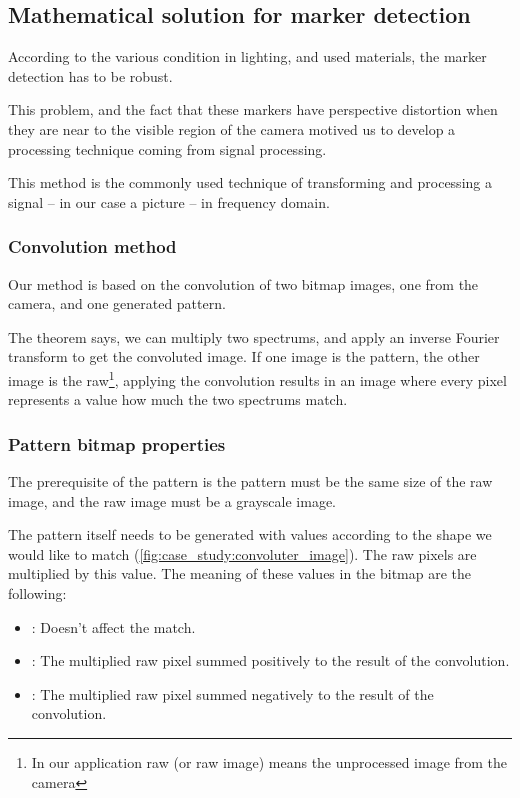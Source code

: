 \subsection{Mathematical solution for marker detection}
\label{fig:case_study:opencv_math}


According to the various condition in lighting, and used materials, the marker detection has to be robust.

This problem, and the fact that these markers have perspective distortion when they are near to the visible region of the camera motived us to develop a processing technique coming from signal processing.

This method is the commonly used technique of transforming and processing a signal -- in our case a picture -- in frequency domain.

\subsubsection{Convolution method}
\label{sec:case_study:convolution}

Our method is based on the convolution of two bitmap images, one from the camera, and one generated pattern.

The theorem says, we can multiply two spectrums, and apply an inverse Fourier transform to get the convoluted image. If one image is the pattern, the other image is the raw\footnote{In our application raw (or raw image) means the unprocessed image from the camera}, applying the convolution results in an image where every pixel represents a value how much the two spectrums match.

\subsubsection{Pattern bitmap properties}

The prerequisite of the pattern is the pattern must be the same size of the raw image, and the raw image must be a grayscale image.

The pattern itself needs to be generated with values according to the shape we would like to match (\cref{fig:case_study:convoluter_image}). The raw pixels are multiplied by this value. The meaning of these values in the bitmap are the following: 
\begin{itemize}
	\item {}: Doesn't affect the match.
	\item {}: The multiplied raw pixel summed positively to the result of the convolution.
	\item {}: The multiplied raw pixel summed negatively to the result of the convolution.
\end{itemize}

